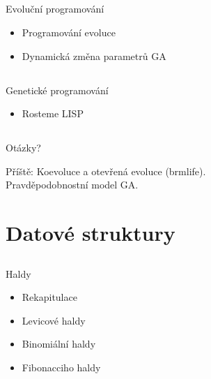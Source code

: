 \documentclass{beamer}
\begin{document}
\subsection{}
\begin{frame}{Evoluční programování}
\begin{itemize}
\item Programování evoluce
\item Dynamická změna parametrů GA
\end{itemize}
\end{frame}

\subsection{}
\begin{frame}{Genetické programování}
\begin{itemize}
\item Rosteme LISP
\end{itemize}
\end{frame}

\subsection{}
\begin{frame}{Otázky?}
\begin{center}
Příště: Koevoluce a otevřená evoluce (brmlife). \\ Pravděpodobnostní model GA.
\end{center}
\end{frame}

\section{Datové struktury}

\subsection{}
\begin{frame}{Haldy}
\begin{itemize}
\item Rekapitulace
\item Levicové haldy
\item Binomiální haldy
\item Fibonacciho haldy
\end{itemize}
\end{frame}
\end{document}
